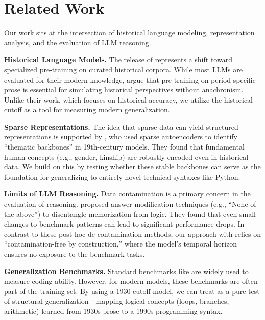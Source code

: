 \section{Related Work}
\label{sec:related}

Our work sits at the intersection of historical language modeling, representation analysis, and the evaluation of LLM reasoning.

{\bf Historical Language Models.} The release of \talkie \cite{radford2026talkie} represents a shift toward specialized pre-training on curated historical corpora. While most LLMs are evaluated for their modern knowledge, \citet{underwood2025anachronism} argue that pre-training on period-specific prose is essential for simulating historical perspectives without anachronism. Unlike their work, which focuses on historical accuracy, we utilize the historical cutoff as a tool for measuring modern generalization.

{\bf Sparse Representations.} The idea that sparse data can yield structured representations is supported by \citet{mahran2025gpt}, who used sparse autoencoders to identify ``thematic backbones'' in 19th-century models. They found that fundamental human concepts (e.g., gender, kinship) are robustly encoded even in historical data. We build on this by testing whether these stable backbones can serve as the foundation for generalizing to entirely novel technical syntaxes like Python.

{\bf Limits of LLM Reasoning.} Data contamination is a primary concern in the evaluation of reasoning. \citet{salido2025limits} proposed answer modification techniques (e.g., ``None of the above'') to disentangle memorization from logic. They found that even small changes to benchmark patterns can lead to significant performance drops. In contrast to these post-hoc de-contamination methods, our approach with \talkie relies on ``contamination-free by construction,'' where the model's temporal horizon ensures no exposure to the benchmark tasks.

{\bf Generalization Benchmarks.} Standard benchmarks like \humaneval are widely used to measure coding ability. However, for modern models, these benchmarks are often part of the training set. By using a 1930-cutoff model, we can treat \humaneval as a pure test of structural generalization—mapping logical concepts (loops, branches, arithmetic) learned from 1930s prose to a 1990s programming syntax.
